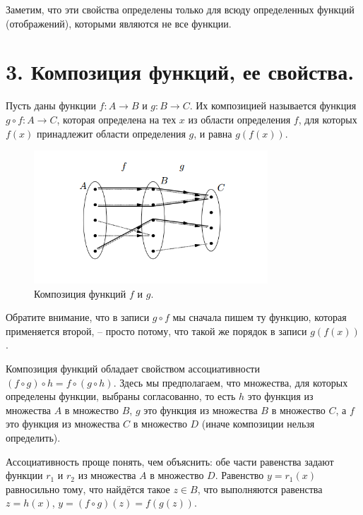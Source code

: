\documentclass[a4paper, 12pt]{article}
\begin{document}
Заметим, что эти свойства определены только для всюду определенных функций (отображений), которыми являются не все функции.

\section*{3. Композиция функций, ее свойства.}
Пусть даны функции $f: A \to B$ и $g: B \to C$. Их композицией называется функция $g \circ f: A \to C$,
которая определена на тех $x$ из области определения $f$, для которых $f(x)$ принадлежит области определения $g$, и равна $g(f(x))$.

\begin{figure}[h]
\begin{center}
    \begin{minipage}[h]{0.6\linewidth}
        \includegraphics[height=5cm, width=\linewidth]{images/Comp.png}
        \caption{Композиция функций $f$ и $g$.}
    \end{minipage}
\end{center}
\end{figure}

Обратите внимание, что в записи $g \circ f$ мы сначала пишем ту функцию, которая применяется второй, -- просто потому, что такой же порядок в записи $g(f(x))$.

Композиция функций обладает свойством ассоциативности
$(f \circ g) \circ h = f \circ (g \circ h)$.
Здесь мы предполагаем, что множества, для которых определены функции, выбраны согласованно, то есть $h$ это функция из множества $A$ в множество $B$, $g$ это функция из множества $B$ в множество $C$, а $f$ это функция из множества $C$ в множество
$D$ (иначе композиции нельзя определить).

Ассоциативность проще понять, чем объяснить: обе части равенства задают функции $r_1$ и $r_2$ из множества $A$ в множество $D$. Равенство $y = r_1(x)$ равносильно тому,
что найдётся такое $z \in B$, что выполняются равенства $z = h(x)$, $y = (f \circ g)(z) = f(g(z))$.
\end{document}
